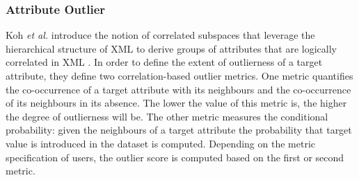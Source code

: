 \subsubsection{Attribute Outlier}
Koh {\em et al.} introduce the notion of correlated subspaces that leverage the hierarchical structure of XML to derive groups of attributes that are logically correlated in XML \cite{koh2008}. In order to define the extent of outlierness of a target attribute, they define two correlation-based outlier metrics. One metric quantifies the co-occurrence of a target attribute with its neighbours and the co-occurrence of its neighbours in its absence. The lower the value of this metric is, the higher the degree of outlierness will be. The other metric measures the conditional probability: given the neighbours of a target attribute the probability that target value is introduced in the dataset is computed. Depending on the metric specification of users, the outlier score is computed based on the first or second metric. 

